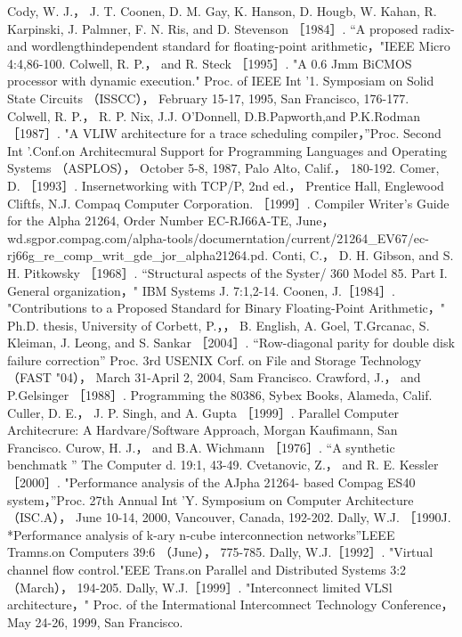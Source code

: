 Cody, W. J.， J. T. Coonen, D. M. Gay, K. Hanson, D. Hougb, W. Kahan, R. Karpinski, J. Palmner, F. N. Ris, and D. Stevenson
［1984］. “A proposed radix-and wordlengthindependent standard for floating-point arithmetic，"IEEE Micro 4:4,86-100.
Colwell, R. P.， and R. Steck ［1995］. "A 0.6 Jmm BiCMOS processor with dynamic execution." Proc. of IEEE Int '1. Symposiam on
Solid State Circuits （ISSCC）， February 15-17, 1995, San Francisco, 176-177.
Colwell, R. P.， R. P. Nix, J.J. O'Donnell, D.B.Papworth,and P.K.Rodman［1987］. "A VLIW architecture for a trace scheduling
compiler，”Proc. Second Int '.Conf.on Architecmural Support for Programming Languages and Operating Systems （ASPLOS），
October 5-8, 1987, Palo Alto, Calif.， 180-192.
Comer, D. ［1993］. Insernetworking with TCP/P, 2nd ed.， Prentice Hall, Englewood Cliftfs, N.J.
Compaq Computer Corporation. ［1999］. Compiler Writer's Guide for the Alpha 21264, Order Number EC-RJ66A-TE, June，
wd.sgpor.compag.com/alpha-tools/documerntation/current/21264_EV67/ec-rj66g_re_comp_writ_gde_jor_alpha21264.pd.
Conti, C.， D. H. Gibson, and S. H. Pitkowsky ［1968］. “Structural aspects of the Syster/ 360 Model 85. Part I. General
organization，" IBM Systems J. 7:1,2-14.
Coonen, J.［1984］. "Contributions to a Proposed Standard for Binary Floating-Point Arithmetic，" Ph.D. thesis, University of
Corbett, P.，， B. English, A. Goel, T.Grcanac, S. Kleiman, J. Leong, and S. Sankar ［2004］. “Row-diagonal parity for double disk failure
correction” Proc. 3rd USENIX Corf. on File and Storage Technology （FAST "04）， March 31-April 2, 2004, Sam Francisco.
Crawford, J.， and P.Gelsinger ［1988］. Programming the 80386, Sybex Books, Alameda, Calif.
Culler, D. E.， J. P. Singh, and A. Gupta ［1999］. Parallel Computer Architecrure: A Hardvare/Software Approach, Morgan
Kaufimann, San Francisco.
Curow, H. J.， and B.A. Wichmann ［1976］. “A synthetic benchmatk ” The Computer d. 19:1, 43-49.
Cvetanovic, Z.， and R. E. Kessler ［2000］. "Performance analysis of the AJpha 21264- based Compag ES40 system，”Proc. 27th
Annual Int 'Y. Symposium on Computer Architecture （ISC.A）， June 10-14, 2000, Vancouver, Canada, 192-202.
Dally, W.J. ［1990J. *Performance analysis of k-ary n-cube interconnection networks”LEEE Tramns.on Computers 39:6 （June）， 775-785.
Dally, W.J.［1992］. "Virtual channel flow control."EEE Trans.on Parallel and Distributed Systems 3:2 （March）， 194-205.
Dally, W.J.［1999］. "Interconnect limited VLSl architecture，" Proc. of the Intermational Intercomnect Technology Conference，
May 24-26, 1999, San Francisco.
